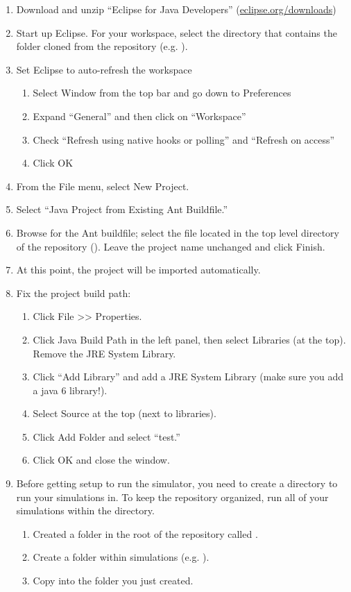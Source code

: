 \documentclass[11pt]{article}
\begin{document}
\begin{enumerate}
\item Download and unzip ``Eclipse for Java Developers'' (\href{http://www.eclipse.org/downloads/}{eclipse.org/downloads})
\item Start up Eclipse. For your workspace, select the directory that contains
  the  folder cloned from the repository (e.g. ).
\item Set Eclipse to auto-refresh the workspace
  \begin{enumerate}
  \item Select Window from the top bar and go down to Preferences
  \item Expand ``General'' and then click on ``Workspace''
  \item Check ``Refresh using native hooks or polling'' and ``Refresh on access''
  \item Click OK
  \end{enumerate}
  
\item From the File menu, select New Project.
\item Select ``Java Project from Existing Ant Buildfile.''
\item Browse for the Ant buildfile; select the  file located in
  the top level directory of the repository
  (). Leave the project name unchanged and
  click Finish.
\item At this point, the project will be imported automatically.
\item Fix the project build path:
  \begin{enumerate}
  \item Click File >> Properties.
  \item Click Java Build Path in the left panel, then select Libraries (at the
    top). Remove the JRE System Library.
  \item Click ``Add Library'' and add a JRE System Library (make sure you add a
    java 6 library!).
  \item Select Source at the top (next to libraries).
  \item Click Add Folder and select ``test.''
  \item Click OK and close the window.
  \end{enumerate}

\item Before getting setup to run the simulator, you need to create a directory
  to run your simulations in.  To keep the repository organized, run all of your
  simulations within the  directory.
  \begin{enumerate}
  \item Created a folder in the root of the repository called .
  \item Create a folder within simulations (e.g. ).
  \item Copy  into the folder you just created.
  \end{enumerate}


\end{enumerate}
\end{document}
